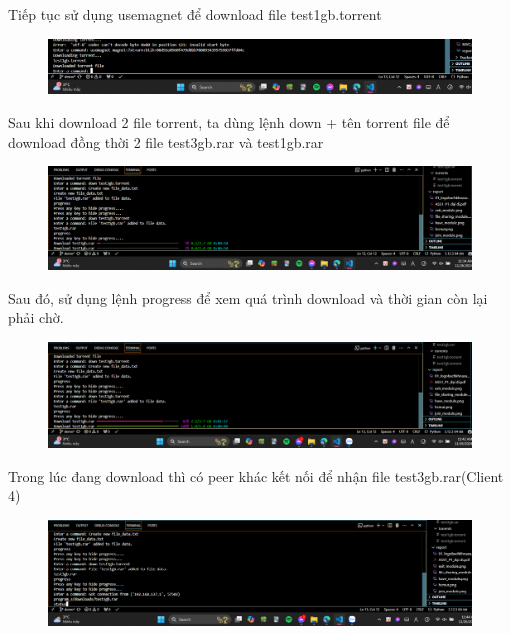 \documentclass[a4paper]{article}
\begin{document}
Tiếp tục sử dụng usemagnet để download file test1gb.torrent
\begin{figure}[H]
    \centering
    \includegraphics[width=1\textwidth]{images/28.png}
    \captionsetup{labelformat=empty}
\end{figure}
Sau khi download 2 file torrent, ta dùng lệnh down + tên torrent file để download đồng thời 2 file test3gb.rar và test1gb.rar
\begin{figure}[H]
    \centering
    \includegraphics[width=1\textwidth]{images/29.png}
    \captionsetup{labelformat=empty}
\end{figure}
Sau đó, sử dụng lệnh progress để xem quá trình download và thời gian còn lại phải chờ.
\begin{figure}[H]
    \centering
    \includegraphics[width=1\textwidth]{images/30.png}
    \captionsetup{labelformat=empty}
\end{figure}
Trong lúc đang download thì có peer khác kết nối để nhận file test3gb.rar(Client 4)
\begin{figure}[H]
    \centering
    \includegraphics[width=1\textwidth]{images/31.png}
    \captionsetup{labelformat=empty}
\end{figure}
\end{document}
